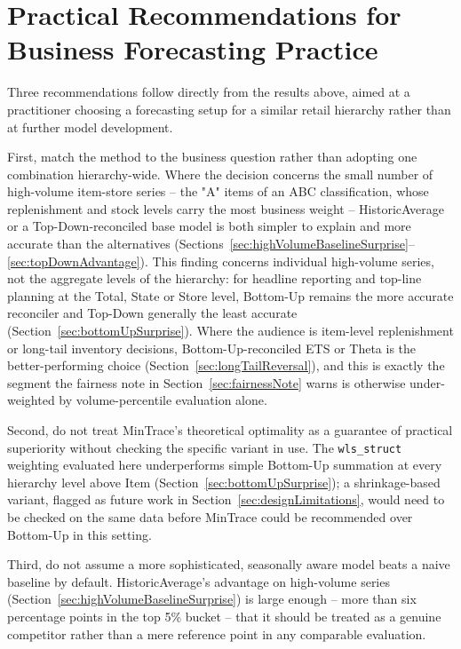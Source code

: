 \section{Practical Recommendations for Business Forecasting Practice}
\label{sec:practicalRecommendations}

Three recommendations follow directly from the results above, aimed at a practitioner choosing a forecasting setup for a similar retail hierarchy rather than at further model development.

First, match the method to the business question rather than adopting one combination hierarchy-wide. Where the decision concerns the small number of high-volume item-store series -- the "A" items of an ABC classification, whose replenishment and stock levels carry the most business weight -- HistoricAverage or a Top-Down-reconciled base model is both simpler to explain and more accurate than the alternatives (Sections~\ref{sec:highVolumeBaselineSurprise}--\ref{sec:topDownAdvantage}). This finding concerns individual high-volume series, not the aggregate levels of the hierarchy: for headline reporting and top-line planning at the Total, State or Store level, Bottom-Up remains the more accurate reconciler and Top-Down generally the least accurate (Section~\ref{sec:bottomUpSurprise}). Where the audience is item-level replenishment or long-tail inventory decisions, Bottom-Up-reconciled ETS or Theta is the better-performing choice (Section~\ref{sec:longTailReversal}), and this is exactly the segment the fairness note in Section~\ref{sec:fairnessNote} warns is otherwise under-weighted by volume-percentile evaluation alone.

Second, do not treat MinTrace's theoretical optimality as a guarantee of practical superiority without checking the specific variant in use. The \texttt{wls\_struct} weighting evaluated here underperforms simple Bottom-Up summation at every hierarchy level above Item (Section~\ref{sec:bottomUpSurprise}); a shrinkage-based variant, flagged as future work in Section~\ref{sec:designLimitations}, would need to be checked on the same data before MinTrace could be recommended over Bottom-Up in this setting.

Third, do not assume a more sophisticated, seasonally aware model beats a naive baseline by default. HistoricAverage's advantage on high-volume series (Section~\ref{sec:highVolumeBaselineSurprise}) is large enough -- more than six percentage points in the top 5\% bucket -- that it should be treated as a genuine competitor rather than a mere reference point in any comparable evaluation.

